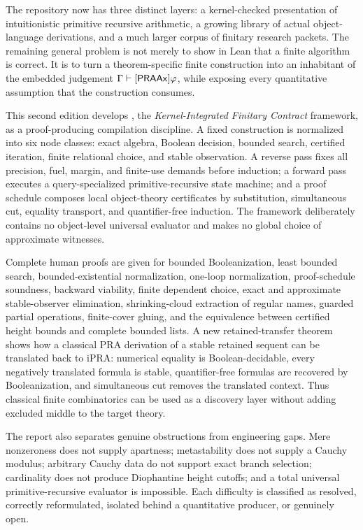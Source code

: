 The repository now has three distinct layers: a kernel-checked presentation of intuitionistic primitive recursive arithmetic, a growing library of actual object-language derivations, and a much larger corpus of finitary research packets.  The remaining general problem is not merely to show in Lean that a finite algorithm is correct.  It is to turn a theorem-specific finite construction into an inhabitant of the embedded judgement 
\(\Gamma\vdash[\mathsf{PRAAx}]\varphi\), while exposing every quantitative assumption that the construction consumes.

This second edition develops \KIFC, the \emph{Kernel-Integrated Finitary Contract} framework, as a proof-producing compilation discipline.  A fixed construction is normalized into six node classes: exact algebra, Boolean decision, bounded search, certified iteration, finite relational choice, and stable observation.  A reverse pass fixes all precision, fuel, margin, and finite-use demands before induction; a forward pass executes a query-specialized primitive-recursive state machine; and a proof schedule composes local object-theory certificates by substitution, simultaneous cut, equality transport, and quantifier-free induction.  The framework deliberately contains no object-level universal evaluator and makes no global choice of approximate witnesses.

Complete human proofs are given for bounded Booleanization, least bounded search, bounded-existential normalization, one-loop normalization, proof-schedule soundness, backward viability, finite dependent choice, exact and approximate stable-observer elimination, shrinking-cloud extraction of regular names, guarded partial operations, finite-cover gluing, and the equivalence between certified height bounds and complete bounded lists.  A new retained-transfer theorem shows how a classical PRA derivation of a stable retained sequent can be translated back to iPRA: numerical equality is Boolean-decidable, every negatively translated formula is stable, quantifier-free formulas are recovered by Booleanization, and simultaneous cut removes the translated context.  Thus classical finite combinatorics can be used as a discovery layer without adding excluded middle to the target theory.

The report also separates genuine obstructions from engineering gaps.  Mere nonzeroness does not supply apartness; metastability does not supply a Cauchy modulus; arbitrary Cauchy data do not support exact branch selection; cardinality does not produce Diophantine height cutoffs; and a total universal primitive-recursive evaluator is impossible.  Each difficulty is classified as resolved, correctly reformulated, isolated behind a quantitative producer, or genuinely open.

